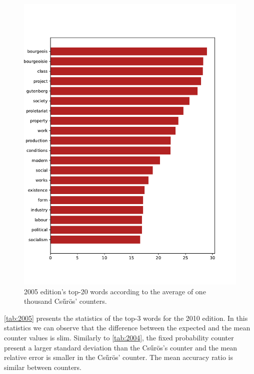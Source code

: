 \begin{figure}[!ht]
    \centering
    \includegraphics[width=0.9\linewidth]{figs/2005.epub-csuros-1000}
    \caption{2005 edition's top-20 words according to the average of one thousand Csűrös' counters.}
    \label{fig:2005-20-csuros}
\end{figure}


\autoref{tab:2005} presents the statistics of the top-3 words for the 2010 edition.
In this statistics we can observe that the difference between the expected and the mean counter values is slim.
Similarly to \autoref{tab:2004}, the fixed probability counter present a larger standard deviation than the Csűrös's counter and the mean relative error is smaller in the Csűrös' counter.
The mean accuracy ratio is similar between counters.


